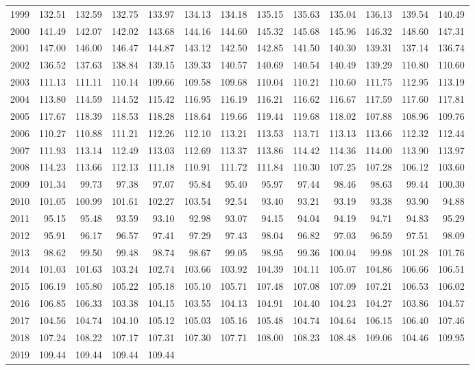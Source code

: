 \begin{longtable}{rrrrrrrrrrrrr}
  1999 & 132.51 & 132.59 & 132.75 & 133.97 & 134.13 & 134.18 & 135.15 & 135.63 & 135.04 & 136.13 & 139.54 & 140.49 \\ 
  2000 & 141.49 & 142.07 & 142.02 & 143.68 & 144.16 & 144.60 & 145.32 & 145.68 & 145.96 & 146.32 & 148.60 & 147.31 \\ 
  2001 & 147.00 & 146.00 & 146.47 & 144.87 & 143.12 & 142.50 & 142.85 & 141.50 & 140.30 & 139.31 & 137.14 & 136.74 \\ 
  2002 & 136.52 & 137.63 & 138.84 & 139.15 & 139.33 & 140.57 & 140.69 & 140.54 & 140.49 & 139.29 & 110.80 & 110.60 \\ 
  2003 & 111.13 & 111.11 & 110.14 & 109.66 & 109.58 & 109.68 & 110.04 & 110.21 & 110.60 & 111.75 & 112.95 & 113.19 \\ 
  2004 & 113.80 & 114.59 & 114.52 & 115.42 & 116.95 & 116.19 & 116.21 & 116.62 & 116.67 & 117.59 & 117.60 & 117.81 \\ 
  2005 & 117.67 & 118.39 & 118.53 & 118.28 & 118.64 & 119.66 & 119.44 & 119.68 & 118.02 & 107.88 & 108.96 & 109.76 \\ 
  2006 & 110.27 & 110.88 & 111.21 & 112.26 & 112.10 & 113.21 & 113.53 & 113.71 & 113.13 & 113.66 & 112.32 & 112.44 \\ 
  2007 & 111.93 & 113.14 & 112.49 & 113.03 & 112.69 & 113.37 & 113.86 & 114.42 & 114.36 & 114.00 & 113.90 & 113.97 \\ 
  2008 & 114.23 & 113.66 & 112.13 & 111.18 & 110.91 & 111.72 & 111.84 & 110.30 & 107.25 & 107.28 & 106.12 & 103.60 \\ 
  2009 & 101.34 & 99.73 & 97.38 & 97.07 & 95.84 & 95.40 & 95.97 & 97.44 & 98.46 & 98.63 & 99.44 & 100.30 \\ 
  2010 & 101.05 & 100.99 & 101.61 & 102.27 & 103.54 & 92.54 & 93.40 & 93.21 & 93.19 & 93.38 & 93.90 & 94.88 \\ 
  2011 & 95.15 & 95.48 & 93.59 & 93.10 & 92.98 & 93.07 & 94.15 & 94.04 & 94.19 & 94.71 & 94.83 & 95.29 \\ 
  2012 & 95.91 & 96.17 & 96.57 & 97.41 & 97.29 & 97.43 & 98.04 & 96.82 & 97.03 & 96.59 & 97.51 & 98.09 \\ 
  2013 & 98.62 & 99.50 & 99.48 & 98.74 & 98.67 & 99.05 & 98.95 & 99.36 & 100.04 & 99.98 & 101.28 & 101.76 \\ 
  2014 & 101.03 & 101.63 & 103.24 & 102.74 & 103.66 & 103.92 & 104.39 & 104.11 & 105.07 & 104.86 & 106.66 & 106.51 \\ 
  2015 & 106.19 & 105.80 & 105.22 & 105.18 & 105.10 & 105.71 & 107.48 & 107.08 & 107.09 & 107.21 & 106.53 & 106.02 \\ 
  2016 & 106.85 & 106.33 & 103.38 & 104.15 & 103.55 & 104.13 & 104.91 & 104.40 & 104.23 & 104.27 & 103.86 & 104.57 \\ 
  2017 & 104.56 & 104.74 & 104.10 & 105.12 & 105.03 & 105.16 & 105.48 & 104.74 & 104.64 & 106.15 & 106.40 & 107.46 \\ 
  2018 & 107.24 & 108.22 & 107.17 & 107.31 & 107.30 & 107.71 & 108.00 & 108.23 & 108.48 & 109.06 & 104.46 & 109.95 \\ 
  2019 & 109.44 & 109.44 & 109.44 & 109.44 &  &  &  &  &  &  &  &  \\ 
   \hline
\hline
\end{longtable}
